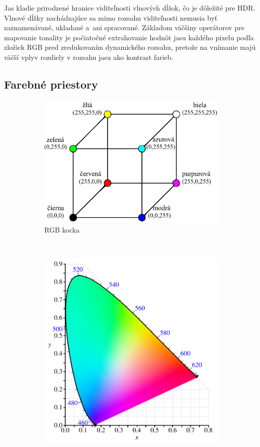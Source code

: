 Jas kladie prirodzené hranice viditeľnosti vlnových dĺžok, čo je dôležité pre HDR.
Vlnové dĺžky nachádzajúce sa mimo rozsahu viditeľnosti nemusia byť zaznamenávané, ukladané a~ani
spracované. Základom väčšiny operátorov pre mapovanie tonality je počiatočné extrahovanie hodnôt
jasu každého pixelu podľa zložiek RGB pred zredukovaním dynamického rozsahu, pretože na vnímanie
majú väčší vplyv rozdiely v rozsahu jasu ako kontrast farieb.

\subsection*{Farebné priestory}

\begin{figure}[t]
    \centering
    \begin{subfigure}{0.54\textwidth}
        \includegraphics[width=\textwidth]{figures/light/rgb}
        \caption{RGB kocka}
        \label{fig:colorModels_rgb}
    \end{subfigure}
    ~
    \begin{subfigure}{0.35\textwidth}
        \includegraphics[width=\textwidth]{figures/light/cie}

\end{subfigure}
\end{figure}
